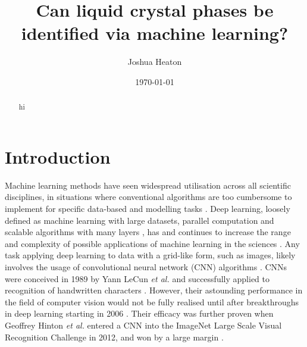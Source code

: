 \documentclass[12pt]{article}
\begin{document}
\title{Can liquid crystal phases be identified via machine learning?}
\author{Joshua Heaton}
\date{\today}

\maketitle

\begin{abstract}
hi
\end{abstract}

\newpage
{}

\section{Introduction}
Machine learning methods have seen widespread utilisation across all scientific disciplines, in situations where conventional algorithms are too cumbersome to implement for specific data-based and modelling tasks \cite{Carleo19}. Deep learning, loosely defined as machine learning with large datasets, parallel computation and scalable algorithms with many layers \cite{Goodfellow16}, has and continues to increase the range and complexity of possible applications of machine learning in the sciences \cite{Carleo19}. Any task applying deep learning to data with a grid-like form, such as images, likely involves the usage of convolutional neural network (CNN) algorithms \cite{Goodfellow16}. CNNs were conceived in 1989 by Yann LeCun \textit{et al.} and successfully applied to recognition of handwritten characters \cite{LeCun89}. However, their astounding performance in the field of computer vision would not be fully realised until after breakthroughs in deep learning starting in 2006 \cite{Goodfellow16}. Their efficacy was further proven when Geoffrey Hinton \textit{et al.} entered a CNN into the ImageNet Large Scale Visual Recognition Challenge in 2012, and won by a large margin \cite{ILSVRC15}.
\end{document}
